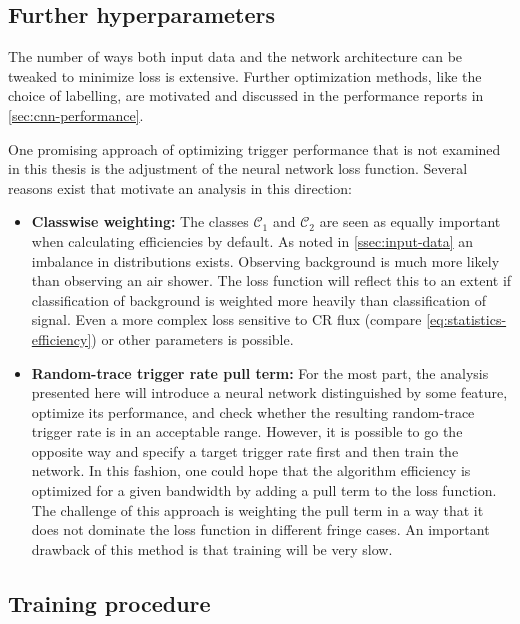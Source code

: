 \subsection{Further hyperparameters}
\label{ssec:further-hyperparameters}

The number of ways both input data and the network architecture can be tweaked to minimize loss is extensive. Further optimization methods, like the choice of 
labelling, are motivated and discussed in the performance reports in \autoref{sec:cnn-performance}.

One promising approach of optimizing trigger performance that is not examined in this thesis is the adjustment of the neural network loss function. Several reasons
exist that motivate an analysis in this direction:

\begin{itemize}
	\item \textbf{Classwise weighting:} The classes $\mathcal{C}_1$ and $\mathcal{C}_2$ are seen as equally important when calculating efficiencies by default. 
	As noted in \autoref{ssec:input-data} an imbalance in distributions exists. Observing background is much more likely than observing an air shower. The loss 
	function will reflect this to an extent if classification of background is weighted more heavily than classification of signal. Even a more complex loss 
	sensitive to CR flux (compare \autoref{eq:statistics-efficiency}) or other parameters is possible.
	\item \textbf{Random-trace trigger rate pull term:} For the most part, the analysis presented here will introduce a neural network distinguished by some 
	feature, optimize its performance, and check whether the resulting random-trace trigger rate is in an acceptable range. However, it is possible to go the 
	opposite way and specify a target trigger rate first and then train the network. In this fashion, one could hope that the algorithm efficiency is optimized for
	a given bandwidth by adding a pull term to the loss function. The challenge of this approach is weighting the pull term in a way that it does not dominate the 
	loss function in different fringe cases. An important drawback of this method is that training will be very slow.
\end{itemize}

\subsection{Training procedure}
\label{ssec:training-procedure}

